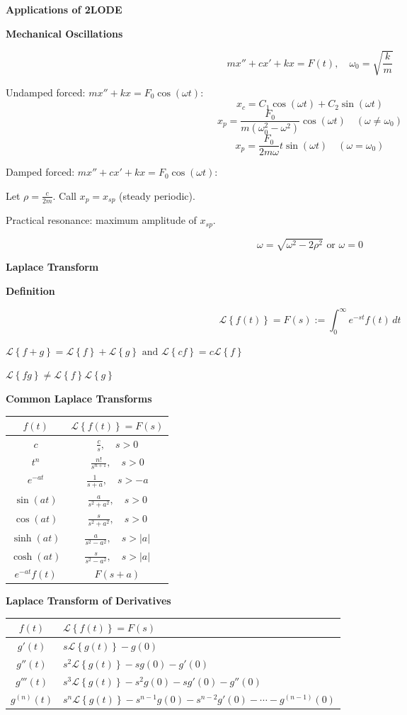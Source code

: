 \documentclass[10pt]{article}
\newcommand{\lap}[1]{\mathcal{L}\left\{#1\right\}}
\newcommand\sectionheading[1]{\begin{center}\large{\textbf{#1}}\end{center}\normalsize}
\newcommand\heading[1]{\smallskip\textbf{#1}\smallskip}
\begin{document}
\begin{multicols*}{3}
\sectionheading{Applications of 2LODE}

\heading{Mechanical Oscillations}

\[mx''+cx'+kx=F(t), \quad\omega_0=\sqrt{\frac km}\]

Undamped forced: $mx''+kx=F_0\cos(\omega t)$:
\[x_c=C_1\cos(\omega t)+C_2\sin(\omega t)\]
\[x_p=\frac{F_0}{m(\omega_0^2-\omega^2)}\cos(\omega t) \quad (\omega\ne\omega_0)\]
\[x_p=\frac{F_0}{2m\omega}t\sin(\omega t) \quad (\omega=\omega_0)\]

Damped forced: $mx''+cx'+kx=F_0\cos(\omega t)$:

Let $\rho=\frac{c}{2m}$. Call $x_p=x_{sp}$ (steady periodic).

Practical resonance: maximum amplitude of $x_{sp}$. 
 
\[\omega=\sqrt{\omega^2-2\rho^2} \text{ or } \omega=0\]

\sectionheading{Laplace Transform}

\heading{Definition}

\[\lap{f(t)}=F(s):=\int_0^\infty e^{-st}f(t)\,dt\]

$\lap{f+g}=\lap{f}+\lap{g} \text{ and }\lap{cf}=c\lap{f}$

$\lap{fg}\ne\lap{f}\lap{g}$

\newpage

\heading{Common Laplace Transforms}

\begin{tabular}{|c|c|}
    \hline
    $f(t)$ & $\lap{f(t)}=F(s)$ \\
    \hline 
    $c$ & $\frac cs, \quad s>0$ \\[5pt]
    $t^n$ & $\frac{n!}{s^{n+1}}, \quad s>0$ \\[5pt]
    $e^{-at}$ & $\frac{1}{s+a}, \quad s>-a$ \\[5pt]
    $\sin(at)$ & $\frac{a}{s^2+a^2}, \quad s>0$ \\[5pt]
    $\cos(at)$ & $\frac{s}{s^2+a^2}, \quad s>0$ \\[5pt]
    $\sinh(at)$ & $\frac{a}{s^2-a^2}, \quad s>|a|$ \\[5pt]
    $\cosh(at)$ & $\frac{s}{s^2-a^2}, \quad s>|a|$ \\[5pt]
    $e^{-at}f(t)$ & $F(s+a)$ \\[5pt]
    \hline
\end{tabular}

\heading{Laplace Transform of Derivatives}

\begin{tabular}{|c|l|}
    \hline 
    $f(t)$ & $\lap{f(t)}=F(s)$ \\
    \hline 
    $g'(t)$ & $s\lap{g(t)}-g(0)$ \\
    $g''(t)$ & $s^2\lap{g(t)}-sg(0)-g'(0)$ \\
    $g'''(t)$ & $s^3\lap{g(t)}-s^2g(0)-sg'(0)-g''(0)$ \\
    $g^{(n)}(t)$ & \footnotesize{$s^n\lap{g(t)}-s^{n-1}g(0)-s^{n-2}g'(0)-\cdots-g^{(n-1)}(0)$} \\
    \hline
\end{tabular}


\end{multicols*}
\end{document}
